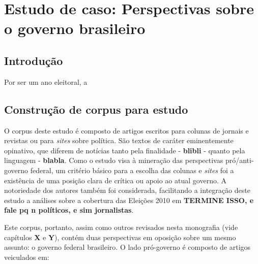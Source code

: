 \chapter{Estudo de caso: Perspectivas sobre o governo brasileiro}

\section{Introdução}



Por ser um ano eleitoral, a

\section{Construção de corpus para estudo}

O corpus deste estudo é composto de artigos escritos para colunas de jornais e revistas ou para \emph{sites} sobre política. São textos de caráter eminentemente opinativo, que diferem de notícias tanto pela finalidade - \textbf{blibli} - quanto pela linguagem - \textbf{blabla}. Como o estudo visa à mineração das perspectivas pró/anti-governo federal, um critério básico para a escolha das colunas e \emph{sites} foi a existência de uma posição clara de crítica ou apoio ao atual governo. A notoriedade dos autores também foi considerada, facilitando a integração deste estudo a análises sobre a cobertura das Eleições 2010 em \textbf{TERMINE ISSO, e fale pq n políticos, e sim jornalistas}.

Este corpus, portanto, assim como outros revisados nesta monografia (vide capítulos \textbf{X} e \textbf{Y}), contém duas perspectivas em oposição sobre um mesmo assunto: o governo federal brasileiro. O lado pró-governo é composto de artigos veiculados em:

